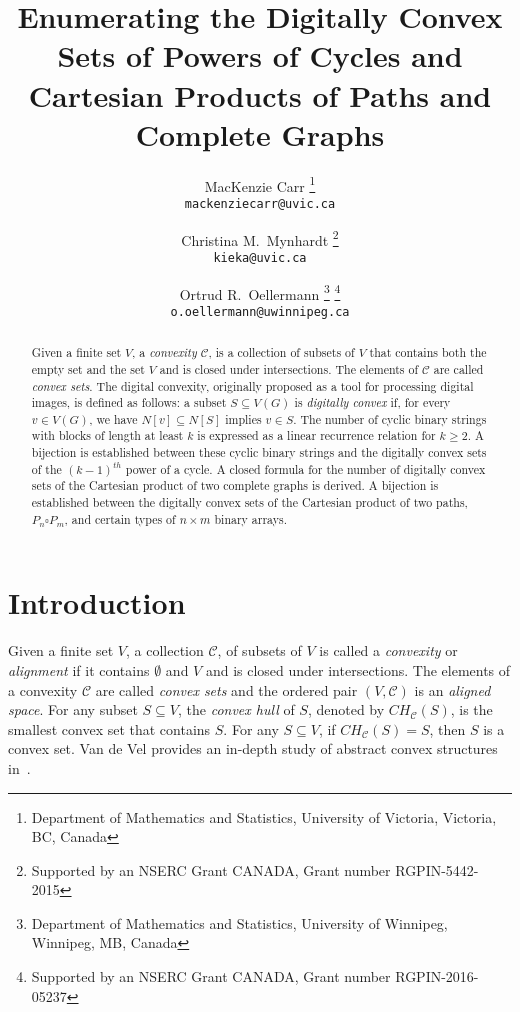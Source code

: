 \documentclass[12pt]{article}
\begin{document}
\title{Enumerating the Digitally Convex Sets of Powers of Cycles and Cartesian Products of Paths and Complete Graphs}
\author{MacKenzie Carr \footnote{Department of Mathematics and Statistics, University of Victoria, Victoria, BC, Canada}  \\ \small{\texttt{mackenziecarr@uvic.ca}} \and Christina M.~Mynhardt \footnotemark[1] \thanks{Supported by an NSERC Grant CANADA, Grant number  RGPIN-5442-2015} \\ \small{\texttt{kieka@uvic.ca}} \and Ortrud R.~Oellermann \footnote{Department of Mathematics and Statistics, University of Winnipeg, Winnipeg, MB, Canada} \thanks{Supported by an NSERC Grant CANADA, Grant number RGPIN-2016-05237} \\ \small{\texttt{o.oellermann@uwinnipeg.ca}}}

\date{\vspace{-5ex}}

\maketitle

\begin{abstract}
Given a finite set $V$, a \emph{convexity} $\mathscr{C}$, is a collection of subsets of $V$ that contains both the empty set and the set $V$ and is closed under intersections. The elements of $\mathscr{C}$ are called \emph{convex sets}. The digital convexity, originally proposed as a tool for processing digital images, is defined as follows: a subset $S\subseteq V(G)$ is \emph{digitally convex} if, for every $v\in V(G)$, we have $N[v]\subseteq N[S]$ implies $v\in S$. The number of cyclic binary strings with blocks of length at least $k$ is expressed as a linear recurrence relation for $k\geq 2$. A bijection is established between these cyclic binary strings and the digitally convex sets of the $(k-1)^{th}$ power of a cycle. A closed formula for the number of digitally convex sets of the Cartesian product of two complete graphs is derived. A bijection is established between the digitally convex sets of the Cartesian product of two paths, $P_n \square P_m$, and certain types of $n \times m$ binary arrays. 
\end{abstract}


\section{Introduction}

Given a finite set $V$, a collection $\mathscr{C}$, of subsets of $V$ is called a \emph{convexity} or \emph{alignment} if it contains $\emptyset$ and $V$ and is closed under intersections. The elements of a convexity $\mathscr{C}$ are called \emph{convex sets} and the ordered pair $(V,\mathscr{C})$ is an \emph{aligned space}. For any subset $S\subseteq V$, the \emph{convex hull} of $S$, denoted by $CH_\mathscr{C}(S)$, is the smallest convex set that contains $S$. For any $S\subseteq V$, if $CH_\mathscr{C}(S)=S$, then $S$ is a convex set. Van de Vel provides an in-depth study of abstract convex structures in~\cite{theory}. 
\end{document}

